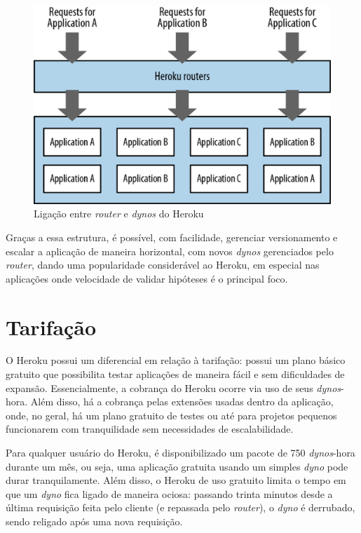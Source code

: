 \begin{figure}[h!]
  \centering
  \includegraphics[scale=0.20]{imagens/heroku_router_dynos.eps}
  \caption{Ligação entre \textit{router} e \textit{dynos} do Heroku\cite{safariheroku}}
\end{figure}

Graças a essa estrutura, é possível, com facilidade, gerenciar versionamento e escalar a aplicação de maneira horizontal, com novos \textit{dynos} gerenciados pelo \textit{router}, dando uma popularidade considerável ao Heroku, em especial nas aplicações onde velocidade de validar hipóteses é o principal foco.

\section{Tarifação}

O Heroku possui um diferencial em relação à tarifação: possui um plano básico gratuito que possibilita testar aplicações de maneira fácil e sem dificuldades de expansão. Essencialmente, a cobrança do Heroku ocorre via uso de seus \textit{dynos}-hora. Além disso, há a cobrança pelas extensões usadas dentro da aplicação, onde, no geral, há um plano gratuito de testes ou até para projetos pequenos funcionarem com tranquilidade sem necessidades de escalabilidade.

Para qualquer usuário do Heroku, é disponibilizado um pacote de 750 \textit{dynos}-hora durante um mês, ou seja, uma aplicação gratuita usando um simples \textit{dyno} pode durar tranquilamente. Além disso, o Heroku de uso gratuito limita o tempo em que um \textit{dyno} fica ligado de maneira ociosa: passando trinta minutos desde a última requisição feita pelo cliente (e repassada pelo \textit{router}), o \textit{dyno} é derrubado, sendo religado após uma nova requisição.

